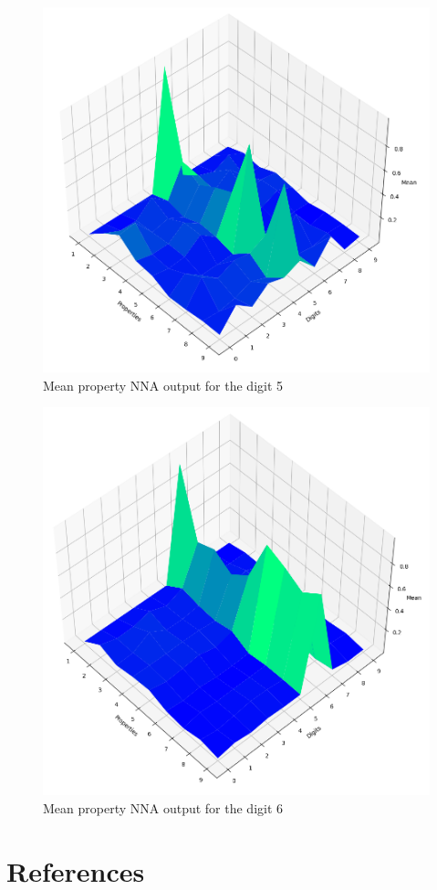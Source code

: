\documentclass[conference]{IEEEtran}
\begin{document}
\begin{figure}[htbp]
\centerline{\includegraphics[width=150mm]{./images/digit-5.png}}
\caption{Mean property NNA output for the digit 5}
\label{digit5votes}
\end{figure}

\begin{figure}[htbp]
\centerline{\includegraphics[width=150mm]{./images/digit-6.png}}
\caption{Mean property NNA output for the digit 6}
\label{digit6votes}
\end{figure}


\section{References}

{}
\end{document}

